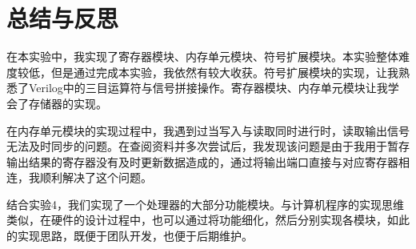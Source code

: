 \documentclass[UTF8]{ctexart}
\begin{document}
\section{总结与反思}\label{sec4}
在本实验中，我实现了寄存器模块、内存单元模块、符号扩展模块。本实验整体难度较低，但是通过完成本实验，我依然有较大收获。符号扩展模块的实现，让我熟悉了Verilog中的三目运算符与信号拼接操作。寄存器模块、内存单元模块让我学会了存储器的实现。\par
在内存单元模块的实现过程中，我遇到过当写入与读取同时进行时，读取输出信号无法及时同步的问题。在查阅资料并多次尝试后，我发现该问题是由于我用于暂存输出结果的寄存器没有及时更新数据造成的，通过将输出端口直接与对应寄存器相连，我顺利解决了这个问题。\par
结合实验4，我们实现了一个处理器的大部分功能模块。与计算机程序的实现思维类似，在硬件的设计过程中，也可以通过将功能细化，然后分别实现各模块，如此的实现思路，既便于团队开发，也便于后期维护。
\end{document}
